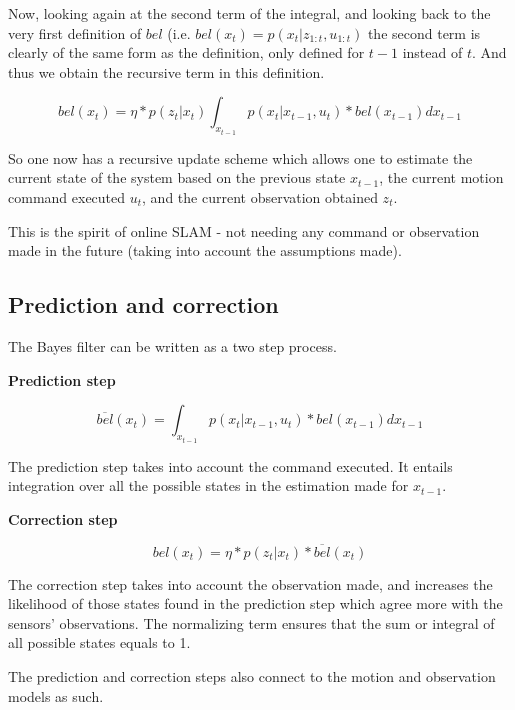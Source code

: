\documentclass[a4paper]{article}
\begin{document}
Now, looking again at the second term of the integral, and looking back to the very first definition of $bel$ (i.e.  $bel(x_t) = p(x_t | z_{1:t}, u_{1:t})$  the second term is clearly of the same form as the definition, only defined for $t-1$ instead of $t$. And thus we obtain the recursive term in this definition.

\begin{equation*}
    bel(x_t) = \eta * p(z_t | x_t)  \int_{x_{t-1}} p(x_t | x_{t-1}, u_t) * bel(x_{t-1}) dx_{t-1}
\end{equation*}

So one now has a recursive update scheme which allows one to estimate the current state of the system based on the previous state $x_{t-1}$, the current motion command executed $u_t$, and the current observation obtained $z_t$.

This is the spirit of online SLAM - not needing any command or observation made in the future (taking into account the assumptions made).

\subsection{Prediction and correction}

The Bayes filter can be written as a two step process.

\textbf{Prediction step}

\begin{equation*}
    \overline{bel}(x_t) = \int_{x_{t-1}} p(x_t | x_{t-1}, u_t) * bel(x_{t-1}) dx_{t-1}
\end{equation*}

The prediction step takes into account the command executed. It entails integration over all the possible states in the estimation made for $x_{t-1}$.

\textbf{Correction step}

\begin{equation*}
    bel(x_t) = \eta * p(z_t | x_t) * \overline{bel}(x_t)
\end{equation*}

The correction step takes into account the observation made, and increases the likelihood of those states found in the prediction step which agree more with the sensors' observations. The normalizing term ensures that the sum or integral of all possible states equals to 1.

The prediction and correction steps also connect to the motion and observation models as such.
\end{document}
